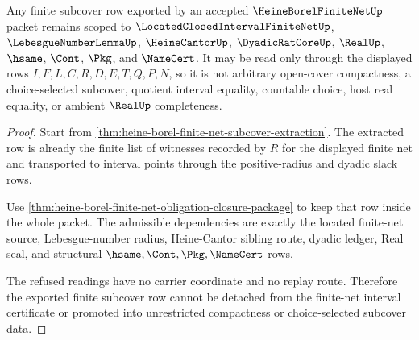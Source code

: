 \begin{theorem}
\label{thm:heine-borel-finite-net-finite-subcover-extraction-scope}
Any finite subcover row exported by an accepted $\HeineBorelFiniteNetUp$ packet remains scoped to $\LocatedClosedIntervalFiniteNetUp$, $\LebesgueNumberLemmaUp$, $\HeineCantorUp$, $\DyadicRatCoreUp$, $\RealUp$, $\hsame$, $\Cont$, $\Pkg$, and $\NameCert$. It may be read only through the displayed rows $I,F,L,C,R,D,E,T,Q,P,N$, so it is not arbitrary open-cover compactness, a choice-selected subcover, quotient interval equality, countable choice, host real equality, or ambient $\RealUp$ completeness.
\end{theorem}
\begin{proof}
Start from \autoref{thm:heine-borel-finite-net-subcover-extraction}. The extracted row is already the finite list of witnesses recorded by $R$ for the displayed finite net and transported to interval points through the positive-radius and dyadic slack rows.

Use \autoref{thm:heine-borel-finite-net-obligation-closure-package} to keep that row inside the whole packet. The admissible dependencies are exactly the located finite-net source, Lebesgue-number radius, Heine-Cantor sibling route, dyadic ledger, Real seal, and structural $\hsame,\Cont,\Pkg,\NameCert$ rows.

The refused readings have no carrier coordinate and no replay route. Therefore the exported finite subcover row cannot be detached from the finite-net interval certificate or promoted into unrestricted compactness or choice-selected subcover data.
\end{proof}

